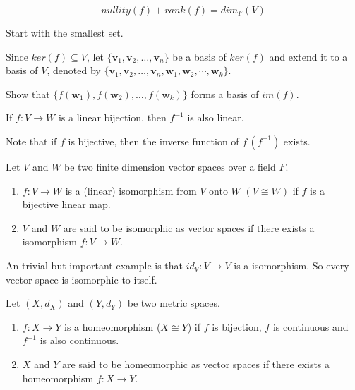 \documentclass[12pt]{article}
\begin{document}
\begin{theorem}
\[ nullity(f) + rank (f) = dim_F(V) \]    
\end{theorem}


\begin{pfbox}
Start with the smallest set. 

Since $ker(f)\subseteq V$, let $\{\mathbf{v}_1,\mathbf{v}_2,\ldots,\mathbf{v}_n\}$ be a basis of $ker(f)$ and extend it to a basis of $V$, denoted by $\{\mathbf{v}_1,\mathbf{v}_2,\ldots,\mathbf{v}_n, \mathbf{w}_1, \mathbf{w}_2,\cdots,\mathbf{w}_k\}$.

Show that $\{ f(\mathbf{w}_1),f(\mathbf{w}_2),\ldots,f(\mathbf{w}_k)\}$ forms a basis of $im(f)$.
\end{pfbox}



\begin{theorem}
    If $f:V\rightarrow W$ is a linear bijection, then $f^{-1}$ is also linear.
\end{theorem}
Note that if $f$ is bijective, then the inverse function of $f\, (f^{-1})$ exists.

\begin{definition}
    Let $V$ and $W$ be two finite dimension vector spaces over a field $F$.
    \begin{enumerate}
        \item $f:V\rightarrow W$ is a (linear) isomorphism from $V$ onto $W$ $(V\cong W)$ if $f$ is a bijective linear map.
        \item $V$ and $W$ are said to be isomorphic as vector spaces if there exists a isomorphism $f: V\rightarrow W$.
    \end{enumerate}
\end{definition}

An trivial but important example is that $id_V:V\rightarrow V$ is a isomorphism. So every vector space is isomorphic to itself.


\begin{gbox}
\begin{definition}[Homeomorphism]
    Let $(X,d_X)$ and $(Y,d_Y)$ be two metric spaces.
\begin{enumerate}
    \item $f:X\rightarrow Y$ is a homeomorphism ($X\cong Y$) if $f$ is bijection, $f$ is continuous and $f^{-1}$ is also continuous.
    \item $X$ and $Y$ are said to be homeomorphic as vector spaces if there exists a homeomorphism $f: X\rightarrow Y$.
\end{enumerate}
\end{definition}
\end{gbox}
\end{document}
